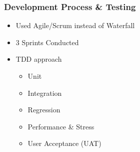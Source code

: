 \frametitle{Development Process \& Testing}

\begin{itemize}
	\item Used Agile/Scrum instead of Waterfall
	\item 3 Sprints Conducted
	\item TDD approach
	\begin{itemize}
		\item Unit
		\item Integration
		\item Regression
		\item Performance \& Stress
		\item User Acceptance (UAT)
	\end{itemize}
\end{itemize}